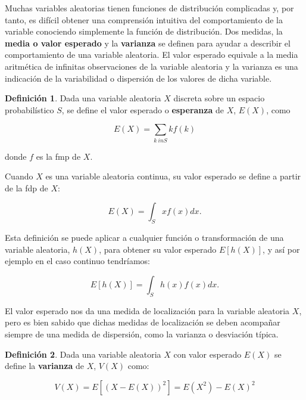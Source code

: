 \documentclass[
]{book}
\newenvironment{yellowbox}{
  \definecolor{shadecolor}{rgb}{210, 180, 140}  
  \color{black}
  \begin{shaded}}
 {\end{shaded}}
\theoremstyle{definition}
\newtheorem{definition}{Definición}[chapter]
\theoremstyle{definition}
\theoremstyle{definition}
\theoremstyle{definition}
\theoremstyle{remark}
\begin{document}
Muchas variables aleatorias tienen funciones de distribución complicadas y, por tanto, es difícil obtener una comprensión intuitiva del comportamiento de la variable conociendo simplemente la función de distribución. Dos medidas, la \textbf{media o valor esperado} y la \textbf{varianza} se definen para ayudar a describir el comportamiento de una variable aleatoria. El valor esperado equivale a la media aritmética de infinitas observaciones de la variable aleatoria y la varianza es una indicación de la variabilidad o dispersión de los valores de dicha variable.

\begin{yellowbox}

\begin{definition}
Dada una variable aleatoria \(X\) discreta sobre un espacio probabilístico \(S\), se define el valor esperado o \textbf{esperanza} de \(X\), \(E(X)\), como

\[E(X) = \sum_{k \ in S} kf(k)\]

donde \(f\) es la fmp de \(X\).

Cuando \(X\) es una variable aleatoria continua, su valor esperado se define a partir de la fdp de \(X\):

\[E(X) = \int_S xf(x)dx.\]
\end{definition}

\end{yellowbox}

Esta definición se puede aplicar a cualquier función o transformación de una variable aleatoria, \(h(X)\), para obtener su valor esperado \(E[h(X)]\), y así por ejemplo en el caso continuo tendríamos:

\[E[h(X)]=\int_S h(x)f(x)dx.\]

El valor esperado nos da una medida de localización para la variable aleatoria \(X\), pero es bien sabido que dichas medidas de localización se deben acompañar siempre de una medida de dispersión, como la varianza o desviación típica.

\begin{yellowbox}

\begin{definition}
\protect\hypertarget{def:unnamed-chunk-1}{}{\label{def:unnamed-chunk-1} }Dada una variable aleatoria \(X\) con valor esperado \(E(X)\) se define la \textbf{varianza} de \(X\), \(V(X)\) como:

\[V(X) = E[(X-E(X))^2]=E(X^2) - E(X)^2\]\\
\end{definition}

\end{yellowbox}
\end{document}
